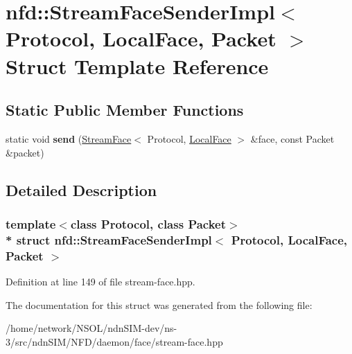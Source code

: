 \hypertarget{structnfd_1_1StreamFaceSenderImpl_3_01Protocol_00_01LocalFace_00_01Packet_01_4}{}\section{nfd\+:\+:Stream\+Face\+Sender\+Impl$<$ Protocol, Local\+Face, Packet $>$ Struct Template Reference}
\label{structnfd_1_1StreamFaceSenderImpl_3_01Protocol_00_01LocalFace_00_01Packet_01_4}
\subsection*{Static Public Member Functions}
\begin{DoxyCompactItemize}
\item 
static void {\bfseries send} (\hyperlink{classnfd_1_1StreamFace}{Stream\+Face}$<$ Protocol, \hyperlink{classnfd_1_1LocalFace}{Local\+Face} $>$ \&face, const Packet \&packet)\hypertarget{structnfd_1_1StreamFaceSenderImpl_3_01Protocol_00_01LocalFace_00_01Packet_01_4_a2ebcad39b7ca9069b5cee34f74da05ad}{}\label{structnfd_1_1StreamFaceSenderImpl_3_01Protocol_00_01LocalFace_00_01Packet_01_4_a2ebcad39b7ca9069b5cee34f74da05ad}

\end{DoxyCompactItemize}


\subsection{Detailed Description}
\subsubsection*{template$<$class Protocol, class Packet$>$\\*
struct nfd\+::\+Stream\+Face\+Sender\+Impl$<$ Protocol, Local\+Face, Packet $>$}



Definition at line 149 of file stream-\/face.\+hpp.



The documentation for this struct was generated from the following file\+:\begin{DoxyCompactItemize}
\item 
/home/network/\+N\+S\+O\+L/ndn\+S\+I\+M-\/dev/ns-\/3/src/ndn\+S\+I\+M/\+N\+F\+D/daemon/face/stream-\/face.\+hpp\end{DoxyCompactItemize}
